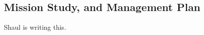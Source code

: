
\subsection{Mission Study, and Management Plan  }
\label{sec:management}

\vspace{-0.05in}

Shaul is writing this. 
